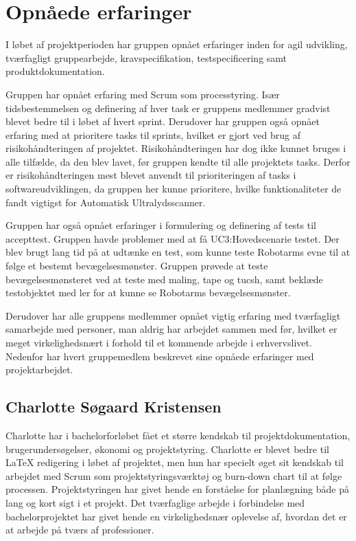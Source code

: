 \section{Opnåede erfaringer}
I løbet af projektperioden har gruppen opnået erfaringer inden for agil udvikling, tværfagligt gruppearbejde, kravspecifikation, testspecificering samt produktdokumentation.

Gruppen har opnået erfaring med Scrum som processtyring. Især tidsbestemmelsen og definering af hver task er gruppens medlemmer gradvist blevet bedre til i løbet af hvert sprint. Derudover har gruppen også opnået erfaring med at prioritere tasks til sprints, hvilket er gjort ved brug af risikohåndteringen af projektet. Risikohåndteringen har dog ikke kunnet bruges i alle tilfælde, da den blev lavet, før gruppen kendte til alle projektets tasks. Derfor er risikohåndteringen mest blevet anvendt til prioriteringen af tasks i softwareudviklingen, da gruppen her kunne prioritere, hvilke funktionaliteter de fandt vigtigst for Automatisk Ultralydsscanner. 

Gruppen har også opnået erfaringer i formulering og definering af tests til accepttest. Gruppen havde problemer med at få UC3:Hovedscenarie testet. Der blev brugt lang tid på at udtænke en test, som kunne teste Robotarms evne til at følge et bestemt bevægelsesmønster. Gruppen prøvede at teste bevægelsesmønsteret ved at teste med maling, tape og tucsh, samt beklæde testobjektet med ler for at kunne se Robotarms bevægelsesmønster. 

Derudover har alle gruppens medlemmer opnået vigtig erfaring med tværfagligt samarbejde med personer, man aldrig har arbejdet sammen med før, hvilket er meget virkelighedsnært i forhold til et kommende arbejde i erhvervslivet.
Nedenfor har hvert gruppemedlem beskrevet sine opnåede erfaringer med projektarbejdet. 

\subsection{Charlotte Søgaard Kristensen}
Charlotte har i bachelorforløbet fået et større kendskab til projektdokumentation, brugerundersøgelser, økonomi og projektstyring. Charlotte er blevet bedre til LaTeX redigering i løbet af projektet, men hun har specielt øget sit kendskab til arbejdet med Scrum som projektstyringsværktøj og burn-down chart til at følge processen. Projektstyringen har givet hende en forståelse for planlægning både på lang og kort sigt i et projekt. Det tværfaglige arbejde i forbindelse med bachelorprojektet har givet hende en virkelighedsnær oplevelse af, hvordan det er at arbejde på tværs af professioner. 

